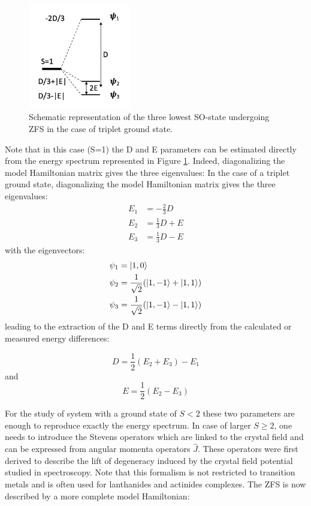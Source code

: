 \documentclass[12pt]{report}
\numberwithin{equation}{section}
\begin{document}
\begin{figure}[!ht]
    \centering
    \includegraphics[width=0.4\textwidth]{Images/SpectreZFS.png}
    \caption{Schematic representation of the three lowest SO-state undergoing ZFS in the case of triplet ground state.}
\label{fig:SpectreZFS}
\end{figure}
Note that in this case (S=1) the D and E parameters can be estimated directly from the energy spectrum represented in Figure \ref{fig:SpectreZFS}. Indeed, diagonalizing the model Hamiltonian matrix gives the three eigenvalues:
In the case of a triplet ground state, diagonalizing the model Hamiltonian matrix gives the three eigenvalues:
\begin{align}
    E_1&=-\frac{2}{3}D\\
    E_2&=\frac{1}{3}D+E\\
    E_3&=\frac{1}{3}D-E
\end{align}
with the eigenvectors:
\begin{align}
    \psi_1&=\ket{1,0}\\
    \psi_2&=\frac{1}{\sqrt{2}}(\ket{1,-1}+\ket{1,1})\\
    \psi_3&=\frac{1}{\sqrt{2}}(\ket{1,-1}-\ket{1,1})
\end{align}
leading to the extraction of the D and E terms directly from the calculated or measured energy differences:

\begin{equation}
    D=\frac{1}{2}(E_2+E_3)-E_1
\end{equation}
and
\begin{equation}
    E=\frac{1}{2}(E_2-E_3)
\end{equation}

For the study of system with a ground state of $S<2$ these two parameters are enough to reproduce exactly the energy spectrum.
In case of larger $S\ge2$, one needs to introduce the Stevens operators which are linked to the crystal field and can be expressed from angular momenta operators $\hat{J}$.
These operators were first derived to describe the lift of degeneracy induced by the crystal field potential studied in spectroscopy.
Note that this formalism is not restricted to transition metals and is often used for lanthanides and actinides complexes.
The ZFS is now described by a more complete model Hamiltonian:
\end{document}
